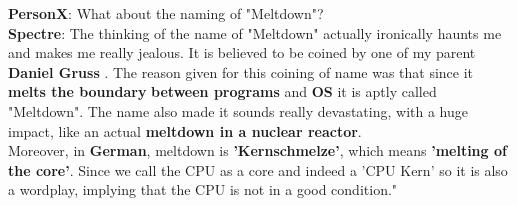 \documentclass[12pt]{article}
\begin{document}
\begin{appendices}
	\textbf{PersonX}: What about the naming of "Meltdown"?\\
	
	\textbf{Spectre}: The thinking of the name of "Meltdown" actually ironically haunts me and makes me really jealous. It is believed to be coined by one of my parent \textbf{Daniel Gruss} . The reason given for this coining of name was that since it \textbf{melts the boundary} \textbf{between programs} and \textbf{OS} it is aptly called "Meltdown". The name also made it sounds really devastating, with a huge impact, like an actual \textbf{meltdown in a nuclear reactor}.\\
	Moreover, in \textbf{German}, meltdown is \textbf{'Kernschmelze'}, which means \textbf{'melting of the core'}. Since we call the CPU as a core and indeed a 'CPU Kern' so it is also a wordplay, implying that the CPU is not in a good condition."
	
\end{appendices}
\end{document}
